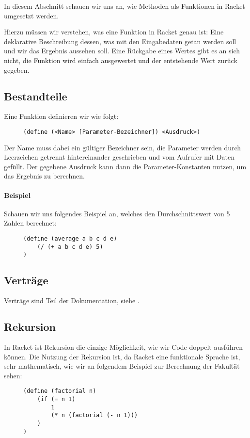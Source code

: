 
In diesem Abschnitt schauen wir uns an, wie Methoden als Funktionen in Racket umgesetzt werden.

Hierzu müssen wir verstehen, was eine Funktion in Racket genau ist: Eine deklarative Beschreibung dessen, was mit den Eingabedaten getan werden soll und wir das Ergebnis aussehen soll. Eine Rückgabe eines Wertes gibt es an sich nicht, die Funktion wird einfach ausgewertet und der entstehende Wert zurück gegeben.

\subsection{Bestandteile} %
	Eine Funktion definieren wir wie folgt:
	\begin{figure}[H]
		\centering
		\lstinline[language = Racket]|(define (<Name> [Parameter-Bezeichner]) <Ausdruck>)|
	\end{figure}
	Der Name muss dabei ein gültiger Bezeichner sein, die Parameter werden durch Leerzeichen getrennt hintereinander geschrieben und vom Aufrufer mit Daten gefüllt. Der gegebene Ausdruck kann dann die Parameter-Konstanten nutzen, um das Ergebnis zu berechnen.
	
	\paragraph{Beispiel}
		Schauen wir uns folgendes Beispiel an, welches den Durchschnittswert von 5 Zahlen berechnet:
		\begin{figure}[H]
			\centering
			\begin{lstlisting}[language = Racket]
(define (average a b c d e)
	(/ (+ a b c d e) 5)
)
\end{lstlisting}
		\end{figure}

\subsection{Verträge}
	Verträge sind Teil der Dokumentation, siehe .

\subsection{Rekursion}
	
	In Racket ist Rekursion die einzige Möglichkeit, wie wir Code doppelt ausführen können. Die Nutzung der Rekursion ist, da Racket eine funktionale Sprache ist, sehr mathematisch, wie wir an folgendem Beispiel zur Berechnung der Fakultät sehen:
	\begin{figure}[H]
		\centering
		\begin{lstlisting}[language = Racket]
(define (factorial n)
	(if (= n 1)
		1
		(* n (factorial (- n 1)))
	)
)
\end{lstlisting}
	\end{figure}
